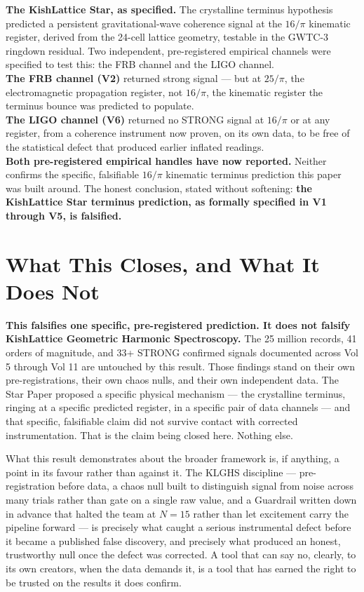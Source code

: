 \documentclass[11pt, letterpaper, openany]{book}
\begin{document}
\begin{competitionbox}
\textbf{The KishLattice Star, as specified.} The crystalline terminus
hypothesis predicted a persistent gravitational-wave coherence signal at
the $16/\pi$ kinematic register, derived from the 24-cell lattice
geometry, testable in the GWTC-3 ringdown residual. Two independent,
pre-registered empirical channels were specified to test this: the FRB
channel and the LIGO channel.\\[0.5em]
\textbf{The FRB channel (V2)} returned strong signal --- but at $25/\pi$,
the electromagnetic propagation register, not $16/\pi$, the kinematic
register the terminus bounce was predicted to populate.\\[0.5em]
\textbf{The LIGO channel (V6)} returned no STRONG signal at $16/\pi$ or
at any register, from a coherence instrument now proven, on its own
data, to be free of the statistical defect that produced earlier
inflated readings.\\[0.5em]
\textbf{Both pre-registered empirical handles have now reported.}
Neither confirms the specific, falsifiable $16/\pi$ kinematic terminus
prediction this paper was built around. The honest conclusion, stated
without softening: \textbf{the KishLattice Star terminus prediction, as
formally specified in V1 through V5, is falsified.}
\end{competitionbox}

\section{What This Closes, and What It Does Not}

\begin{warningbox}
\textbf{This falsifies one specific, pre-registered prediction. It does
not falsify KishLattice Geometric Harmonic Spectroscopy.} The 25 million
records, 41 orders of magnitude, and 33+ STRONG confirmed signals
documented across Vol 5 through Vol 11 are untouched by this result.
Those findings stand on their own pre-registrations, their own chaos
nulls, and their own independent data. The Star Paper proposed a
specific physical mechanism --- the crystalline terminus, ringing at a
specific predicted register, in a specific pair of data channels --- and
that specific, falsifiable claim did not survive contact with corrected
instrumentation. That is the claim being closed here. Nothing else.
\end{warningbox}

What this result demonstrates about the broader framework is, if
anything, a point in its favour rather than against it. The KLGHS
discipline --- pre-registration before data, a chaos null built to
distinguish signal from noise across many trials rather than gate on a
single raw value, and a Guardrail written down in advance that halted
the team at $N=15$ rather than let excitement carry the pipeline forward
--- is precisely what caught a serious instrumental defect before it
became a published false discovery, and precisely what produced an
honest, trustworthy null once the defect was corrected. A tool that
can say no, clearly, to its own creators, when the data demands it, is
a tool that has earned the right to be trusted on the results it does
confirm.
\end{document}
